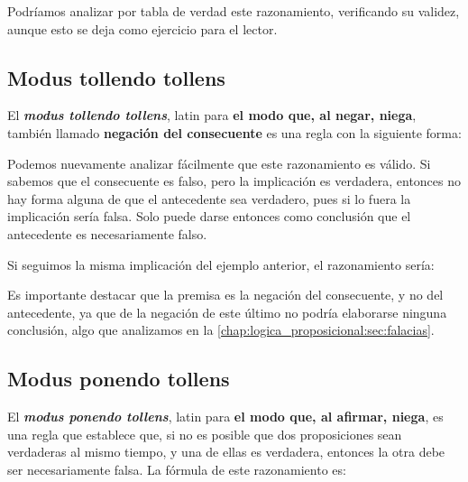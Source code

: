Podríamos analizar por tabla de verdad este razonamiento, verificando su
validez, aunque esto se deja como ejercicio para el lector.

\subsection{Modus tollendo tollens}

El \textit{\textbf{modus tollendo tollens}}, latin para \textbf{el modo que, al
negar, niega}, también llamado \textbf{negación del consecuente} es una regla
con la siguiente forma:

\begin{minipage}{0.3\textwidth}
    \begin{lreasoning}
        \lpremise{$\Phi \lthen \Psi$}
        \lpremise{$\lnot \Psi$}
        \lconclusion{$\lnot \Phi$}
    \end{lreasoning}
\end{minipage}

Podemos nuevamente analizar fácilmente que este razonamiento es válido. Si
sabemos que el consecuente es falso, pero la implicación es verdadera, entonces
no hay forma alguna de que el antecedente sea verdadero, pues si lo fuera la
implicación sería falsa. Solo puede darse entonces como conclusión que el
antecedente es necesariamente falso.

Si seguimos la misma implicación del ejemplo anterior, el razonamiento sería:

\begin{minipage}{0.5\textwidth}
    \begin{lreasoning}
    \end{lreasoning}
\end{minipage}

Es importante destacar que la premisa es la negación del consecuente, y no del
antecedente, ya que de la negación de este último no podría elaborarse ninguna
conclusión, algo que analizamos en la
\autoref{chap:logica_proposicional:sec:falacias}.

\subsection{Modus ponendo tollens}

El \textit{\textbf{modus ponendo tollens}}, latin para \textbf{el modo que, al
afirmar, niega}, es una regla que establece que, si no es posible que dos
proposiciones sean verdaderas al mismo tiempo, y una de ellas es verdadera,
entonces la otra debe ser necesariamente falsa. La fórmula de este razonamiento
es:

